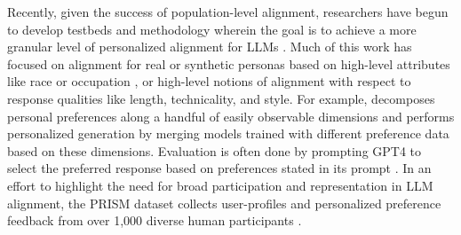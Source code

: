 Recently, given the success of population-level alignment, researchers have begun to develop testbeds and methodology wherein the goal is to achieve a more granular level of personalized alignment for LLMs \citep{castricato2024personareproducibletestbedpluralistic, jang2023personalizedsoupspersonalizedlarge, kirk2024prismalignmentprojectparticipatory, li2024personalizedlanguagemodelingpersonalized}.
Much of this work has focused on alignment for real or synthetic personas based on high-level attributes like race or occupation \citep{castricato2024personareproducibletestbedpluralistic, chan2024scalingsyntheticdatacreation}, or high-level notions of alignment with respect to response qualities like length, technicality, and style.  
For example, \citet{jang2023personalizedsoupspersonalizedlarge} decomposes personal preferences along a handful of easily observable dimensions and performs personalized generation by merging models trained with different preference data based on these dimensions.
Evaluation is often done by prompting GPT4 to select the preferred response based on preferences stated in its prompt \citep{jang2023personalizedsoupspersonalizedlarge, castricato2024personareproducibletestbedpluralistic}.  
In an effort to highlight the need for broad participation and representation in LLM alignment, the PRISM dataset collects user-profiles and personalized preference feedback from over 1,000 diverse human participants \citep{kirk2024prismalignmentprojectparticipatory}.



